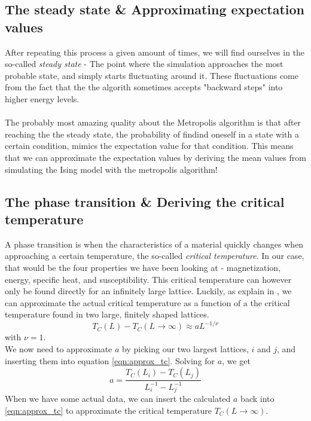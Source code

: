\documentclass[10pt,a4paper]{article}
\begin{document}
\subsection{The steady state \& Approximating expectation values}
After repeating this process a given amount of times, we will find ourselves in the so-called \textit{steady state} - The point where the simulation approaches the most probable state, and simply starts fluctuating around it. These fluctuations come from the fact that the the algorith sometimes accepts "backward steps" into higher energy levels.\\\\
The probably most amazing quality about the Metropolis algorithm is that after reaching the the steady state, the probability of findind oneself in a state with a certain condition, mimics the expectation value for that condition. This means that we can approximate the expectation values by deriving the mean values from simulating the Ising model with the metropolis algorithm!


\subsection{The phase transition \& Deriving the critical temperature}\label{sec:approx_tc}
A phase transition is when the characteristics of a material quickly changes when approaching a certain temperature, the so-called \textit{critical temperature}. In our case, that would be the four properties we have been looking at - magnetization, energy, specific heat, and susceptibility. This critical temperature can however only be found directly for an infinitely large lattice. Luckily, as explain in \cite{lecture_notes}, we can approximate the actual critical temperature as a function of a the critical temperature found in two large, finitely shaped lattices.
\begin{equation}\label{eqn:approx_tc}
T_C(L) - T_C(L \rightarrow \infty) \approx aL^{-1/\nu}
\end{equation}
with $\nu = 1$.\\
We now need to approximate $a$ by picking our two largest lattices, $i$ and $j$, and inserting them into equation \ref{eqn:approx_tc}. Solving for $a$, we get
\begin{equation}
a = \frac{T_C(L_i) - T_C(L_j)}{L_i^{-1} - L_j^{-1}}
\end{equation}
When we have some actual data, we can insert the calculated $a$ back into \ref{eqn:approx_tc} to approximate the critical temperature $T_C(L\rightarrow\infty)$.
\end{document}
